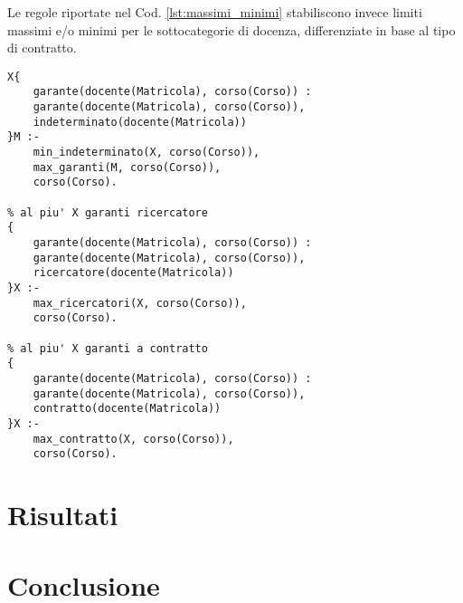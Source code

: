 \documentclass[journal]{IEEEtran}
\begin{document}
Le regole riportate nel Cod. \ref{lst:massimi_minimi} stabiliscono invece limiti
massimi e/o minimi per le sottocategorie di docenza, differenziate in base al
tipo di contratto.
\begin{lstlisting}[style=asp, caption={Frammento del file
\texttt{main.lp}.}, label={lst:massimi_minimi}]
% almeno X garanti a tempo indeterminato
X{
	garante(docente(Matricola), corso(Corso)) :
	garante(docente(Matricola), corso(Corso)),
	indeterminato(docente(Matricola))
}M :-
	min_indeterminato(X, corso(Corso)),
	max_garanti(M, corso(Corso)),
	corso(Corso).

% al piu' X garanti ricercatore
{
	garante(docente(Matricola), corso(Corso)) :
	garante(docente(Matricola), corso(Corso)),
	ricercatore(docente(Matricola))
}X :-
	max_ricercatori(X, corso(Corso)),
	corso(Corso).

% al piu' X garanti a contratto
{
	garante(docente(Matricola), corso(Corso)) :
	garante(docente(Matricola), corso(Corso)),
	contratto(docente(Matricola))
}X :-
	max_contratto(X, corso(Corso)),
	corso(Corso).
\end{lstlisting}

\section{Risultati}

\section{Conclusione}



\end{document}
